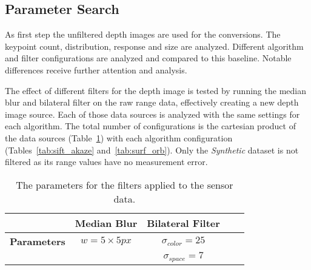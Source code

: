 \subsection{Parameter Search}

As first step the unfiltered depth images are used for the conversions.
The keypoint count, distribution, response and size are analyzed.
Different algorithm and filter configurations are analyzed and compared to this baseline.
Notable differences receive further attention and analysis.

The effect of different filters for the depth image is tested by running the median blur and bilateral filter on the raw range data, effectively creating a new depth image source.
Each of those data sources is analyzed with the same settings for each algorithm.
The total number of configurations is the cartesian product of the data sources (Table~\ref{tab:filter}) with each algorithm configuration (Tables~\ref{tab:sift_akaze} and~\ref{tab:surf_orb}).
Only the \emph{Synthetic} dataset is not filtered as its range values have no measurement error.
\begin{table}[H]
    {\renewcommand{\arraystretch}{1.3}%
    \setlength{\tabcolsep}{0.3em}%
    \footnotesize
    \begin{tabular}{ccccc}
    \toprule
    \null & \textbf{Median Blur} & \textbf{Bilateral Filter} \\
    \midrule
    \textbf{Parameters}
        & $w = 5 \times 5px$
        & $\sigma_{color} = 25$ \\
    \null & \null & $\sigma_{space} = 7$ \\
    \bottomrule
    \end{tabular}
    }
    \caption{The parameters for the filters applied to the sensor data.}\label{tab:filter}
\end{table}
